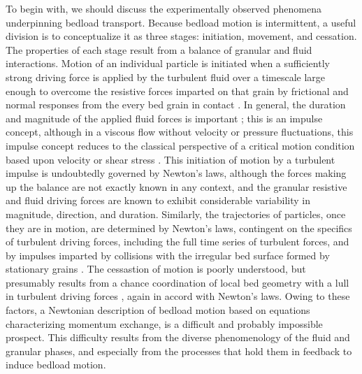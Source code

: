 \documentclass{article}
\begin{document}
To begin with, we should discuss the experimentally observed phenomena underpinning bedload transport. 
Because bedload motion is intermittent, a useful division is to conceptualize it as three stages: initiation, movement, and cessation. 
The properties of each stage result from a balance of granular and fluid interactions. 
Motion of an individual particle is initiated when a sufficiently strong driving force is applied by the turbulent fluid over a timescale large enough to overcome the resistive forces imparted on that grain by frictional and normal responses from the every bed grain in contact \citep{Paintal1971, Valyrakis2010, Celik2014}. 
In general, the duration and magnitude of the applied fluid forces is important \citep{Diplas2008}; this is an impulse concept, although in a viscous flow without velocity or pressure fluctuations, this impulse concept reduces to the classical perspective of a critical motion condition based upon velocity or shear stress \citep{Shields1936, Buffington1997}. 
This initiation of motion by a turbulent impulse is undoubtedly governed by Newton's laws, although the forces making up the balance are not exactly known in any context, and the granular resistive \citep{Lamb2008} and fluid driving \citep{Schmeeckle2007, Celik2014, Amir2014, Shih2017} forces are known to exhibit considerable variability in magnitude, direction, and duration. 
Similarly, the trajectories of particles, once they are in motion, are determined by Newton's laws, contingent on the specifics of turbulent driving forces, including the full time series of turbulent forces, and by impulses imparted by collisions with the irregular bed surface formed by stationary grains \citep{Wiberg1985, Bialik2015}. 
The cessastion of motion is poorly understood, but presumably results from a chance coordination of local bed geometry with a lull in turbulent driving forces \citep{Pahtz2018}, again in accord with Newton's laws.  
Owing to these factors, a Newtonian description of bedload motion based on equations characterizing momentum exchange, is a difficult and probably impossible prospect. 
This difficulty results from the diverse phenomenology of the fluid and granular phases, and especially from the processes that hold them in feedback to induce bedload motion. 
\end{document}
